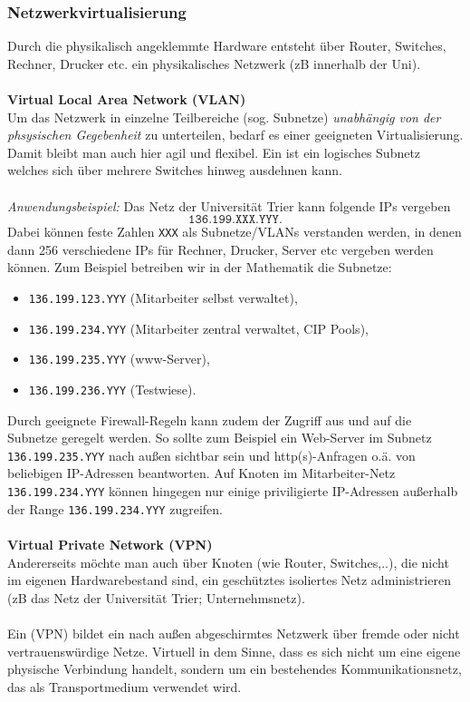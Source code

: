 \subsubsection{Netzwerkvirtualisierung}
Durch die physikalisch angeklemmte Hardware entsteht über Router, Switches, Rechner, Drucker etc. ein physikalisches Netzwerk (zB innerhalb der Uni).\\~\\
\textbf{Virtual Local Area Network (VLAN)}\\
Um das Netzwerk in einzelne Teilbereiche (sog. Subnetze) \textit{unabhängig von der phsysischen Gegebenheit} zu unterteilen, bedarf es einer geeigneten Virtualisierung. Damit bleibt man auch hier agil und flexibel. Ein  ist ein logisches Subnetz welches sich über mehrere Switches hinweg ausdehnen kann.\\~\\
\textit{Anwendungsbeispiel:} Das Netz der Universität Trier kann folgende IPs vergeben $$\texttt{136.199.XXX.YYY}.$$ Dabei können feste Zahlen \texttt{XXX} als Subnetze/VLANs verstanden werden, in denen dann 256 verschiedene IPs für Rechner, Drucker, Server etc vergeben werden können. Zum Beispiel betreiben wir in der Mathematik die Subnetze:
\begin{itemize}
	\item \texttt{136.199.123.YYY} (Mitarbeiter selbst verwaltet),
	\item \texttt{136.199.234.YYY} (Mitarbeiter zentral verwaltet, CIP Pools),
	\item \texttt{136.199.235.YYY} (www-Server),
	\item \texttt{136.199.236.YYY} (Testwiese).
\end{itemize}
Durch geeignete Firewall-Regeln kann zudem der Zugriff aus und auf die Subnetze geregelt werden. So sollte zum Beispiel ein Web-Server im Subnetz \texttt{136.199.235.YYY} nach außen sichtbar sein und http(s)-Anfragen o.ä. von beliebigen IP-Adressen beantworten. Auf Knoten im Mitarbeiter-Netz \texttt{136.199.234.YYY} können hingegen nur einige priviligierte IP-Adressen außerhalb der Range \texttt{136.199.234.YYY} zugreifen.
~\\~\\
\textbf{Virtual Private Network (VPN)}\\
Andererseits möchte man auch über Knoten (wie Router, Switches,..), die nicht im eigenen Hardwarebestand sind, ein geschütztes isoliertes Netz administrieren (zB das Netz der Universität Trier; Unternehmsnetz).\\~\\ Ein  (VPN) bildet ein nach außen abgeschirmtes Netzwerk über fremde oder nicht vertrauenswürdige Netze. Virtuell in dem Sinne, dass es sich nicht um eine eigene physische Verbindung handelt, sondern um ein bestehendes Kommunikationsnetz, das als Transportmedium verwendet wird.\\
